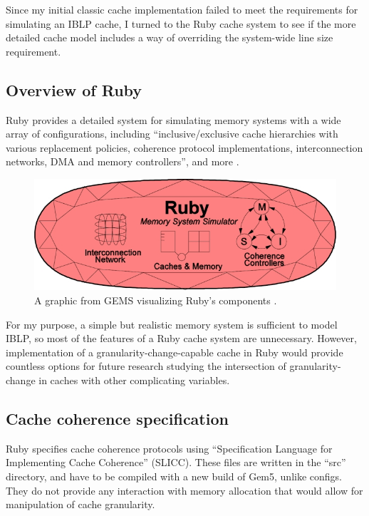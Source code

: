 \documentclass[12pt,twoside]{reedthesis}
\begin{document}
	Since my initial classic cache implementation failed to meet the requirements for simulating an IBLP cache, I turned to the Ruby cache system to see if the more detailed cache model includes a way of overriding the system-wide line size requirement.

	\subsection*{Overview of Ruby}

	Ruby provides a detailed system for simulating memory systems with a wide array of configurations, including ``inclusive/exclusive cache hierarchies with various replacement policies, coherence protocol implementations, interconnection networks, DMA and memory controllers'', and more \cite{gem5-ruby}.

	\begin{figure}[h]
		\centering
		\includegraphics[width=4.5in]{figures/ruby.jpg}
		\caption{A graphic from GEMS visualizing Ruby's components \cite{gem5-ruby}.}
	\end{figure}

	For my purpose, a simple but realistic memory system is sufficient to model IBLP, so most of the features of a Ruby cache system are unnecessary. However, implementation of a granularity-change-capable cache in Ruby would provide countless options for future research studying the intersection of granularity-change in caches with other complicating variables.

	\subsection*{Cache coherence specification}

	Ruby specifies cache coherence protocols using ``Specification Language for Implementing Cache Coherence'' (SLICC). These files are written in the ``src'' directory, and have to be compiled with a new build of Gem5, unlike configs. They do not provide any interaction with memory allocation that would allow for manipulation of cache granularity.
\end{document}
